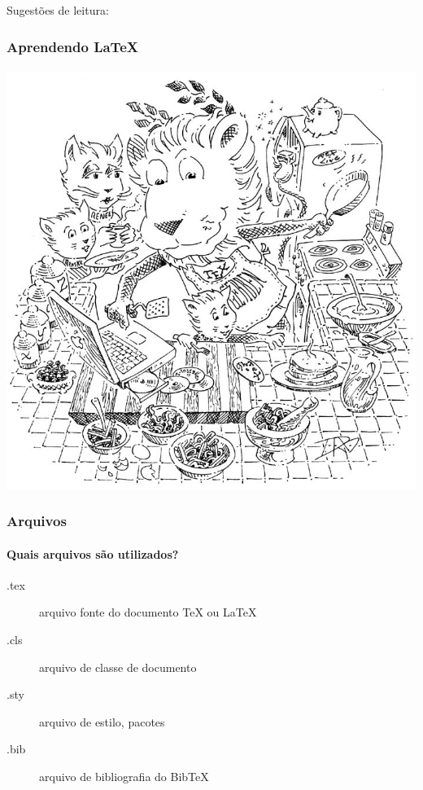  




\begin{frame}
Sugestões de leitura: 
\vspace{2ex}

\vspace{2ex}

\vspace{2ex}

\vspace{2ex}

\end{frame}


\begin{frame}
\frametitle{Aprendendo \LaTeX{}}
\framesubtitle{}
\centering
\includegraphics[width=0.6\linewidth,height=0.7\textheight,keepaspectratio]{figures/lion02.png}
\end{frame}

\begin{frame}
\frametitle{Arquivos}
\framesubtitle{Quais arquivos são utilizados?}
\begin{description}
\item[.tex] arquivo fonte do documento \TeX{} ou \LaTeX{}
\item[.cls] arquivo de classe de documento
\item[.sty] arquivo de estilo, pacotes 
\item[.bib] arquivo de bibliografia do BibTeX
\end{description}
\end{frame}

